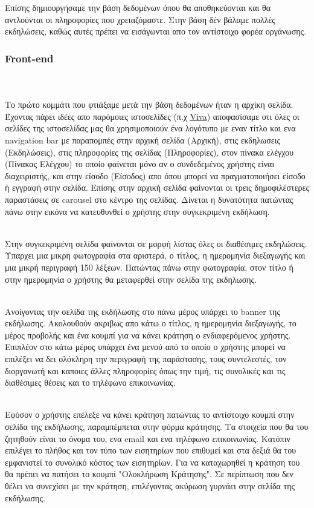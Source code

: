 \documentclass{acmart}
\begin{document}
Επίσης δημιουργήσαμε την βάση δεδομένων όπου θα αποθηκεύονται και θα αντλούνται οι πληροφορίες που χρειαζόμαστε. Στην βάση δέν βάλαμε πολλές εκδηλώσεις, καθώς αυτές πρέπει να εισάγωνται απο τον αντίστοιχο φορέα οργάνωσης.

\subsubsection{Front-end}\hfill\\

\hfill\\
Το πρώτο κομμάτι που φτιάξαμε μετά την βάση δεδομένων ήταν η αρχίκη σελίδα. Έχοντας πάρει ιδέες απο παρόμοιες ιστοσελίδες (π.χ \href{www.viva.gr}{Viva}) αποφασίσαμε οτι όλες οι σελίδες της ιστοσελίδας μας θα χρησιμοποιούν ένα λογότυπο με εναν τίτλο και ενα navigation bar με παραπομπές στην αρχική σελίδα (Αρχική), στις εκδηλωσεις (Εκδηλώσεις), στις πληροφορίες της σελίδας (Πληροφορίες), στον πίνακα ελέγχου (Πίνακας Ελέγχου) το οποίο φαίνεται μόνο αν ο συνδεδεμένος χρήστης είναι διαχειριστής, και στην είσοδο (Είσοδος) απο όπου μπορεί να πραγματοποιήσει είσοδο ή εγγραφή στην σελίδα. Επίσης στην αρχική σελίδα φαίνονται οι τρεις δημοφιλέστερες παραστάσεις σε carousel στο κέντρο της σελίδας. Δίνεται η δυνατότητα πατώντας πάνω στην εικόνα να κατευθυνθεί ο χρήστης στην συγκεκριμένη εκδήλωση.


\hfill\\
Στην συγκεκριμένη σελίδα φαίνονται σε μορφή λίστας όλες οι διαθέσιμες εκδηλώσεις. Υπαρχει μια μικρη φωτογραφία στα αριστερά, ο τίτλος, η ημερομηνία διεξαγωγής και μια μικρή περιγραφή 150 λέξεων. Πατώντας πάνω στην φωτογραφία, στον τίτλο ή στην ημερομηνία ο χρήστης θα μεταφερθεί στην σελίδα της εκδηλωσης.

\hfill\\
Ανοίγοντας την σελίδα της εκδήλωσης στο πάνω μέρος υπάρχει το banner της εκδήλωσης. Ακολουθούν ακριβως απο κάτω ο τίτλος, η ημερομηνία διεξαγωγής, το μέρος προβολής και ένα κουμπί για να κάνει κράτηση ο ενδιαφερόμενος χρήστης. Επιπλέον στο κάτω μέρος υπάρχει ένα μενού από το οποίο ο χρήστης μπορεί να επιλέξει να δει ολόκληρη την περιγραφή της παράστασης, τους συντελεστές, τον διοργανωτή και καποιες άλλες πληροφορίες όπως την τιμή, τις συνολικές και τις διαθέσιμες θέσεις και το τηλέφωνο επικοινωνίας.

\hfill\\
Εφόσον ο χρήστης επέλεξε να κάνει κράτηση πατώντας το αντίστοιχο κουμπί στην σελίδα της εκδήλωσης, παραμπέμπεται στην φόρμα κράτησης. Τα στοιχεία που θα του ζητηθούν είναι το όνομα του, ενα email και ενα τηλέφωνο επικοινωνίας. Κατόπιν επιλέγει το πλήθος και τον τύπο των εισητηρίων που επιθυμεί και στα δεξιά θα του εμφανιστεί το συνολικό κόστος των εισητηρίων. Για να καταχωρηθεί η κράτηση του θα πρέπει να πατήσει το κουμπί "Ολοκλήρωση Κράτησης". Σε περίπτωση που δεν θέλει να συνεχίσει με την κράτηση, επιλέγοντας ακύρωση γυρνάει στην σελίδα της εκδήλωσης.
\end{document}
